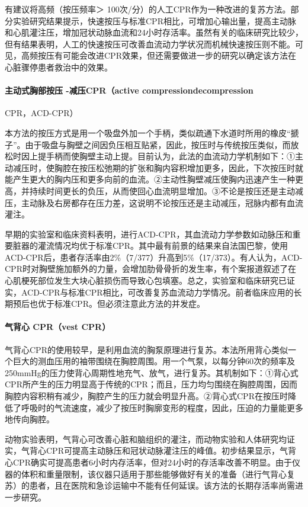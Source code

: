 有建议将高频（按压频率＞
100次/分）的人工CPR作为一种改进的复苏方法。部分实验研究结果提示，快速按压与标准CPR相比，可增加心输出量，提高主动脉和心肌灌注压，增加冠状动脉血流和24小时存活率。虽然有关的临床研究比较少，但有结果表明，人工的快速按压可改善血流动力学状况而机械快速按压则不能。可见，高频按压有可能会改进CPR效果，但还需要做进一步的研究以确定该方法在心脏骤停患者救治中的效果。

\paragraph{主动式胸部按压 -减压CPR（active compressiondecompression}
CPR，ACD-CPR）

本方法的按压方式是用一个吸盘外加一个手柄，类似疏通下水道时所用的橡皮“搋子”。由于吸盘与胸壁之间因负压相互贴紧，因此，按压时与传统按压类似，而放松时因上提手柄而使胸壁主动上提。目前认为，此法的血流动力学机制如下：①主动减压时，使胸腔在按压松弛期的扩张和胸内容积增加更多，因此，下次按压时就能产生更大的胸内压和更多向前的血流。②主动性胸壁减压使胸内迅速产生一种更高，并持续时间更长的负压，从而使回心血流明显增加。③不论是按压还是主动减压，主动脉及右房都存在压力差，这说明不论按压还是主动减压，冠脉内都有血流灌注。

早期的实验室和临床资料表明，进行ACD-CPR，其血流动力学参数如动脉压和重要脏器的灌流情况均优于标准CPR。其中最有前景的结果来自法国巴黎，使用ACD-CPR后，患者存活率由2\%（7/377）升高到5\%（17/373）。有人认为，ACD-CPR时对胸壁施加额外的力量，会增加肋骨骨折的发生率，有个案报道叙述了在心肌梗死部位发生大块心脏损伤而导致心包填塞。总之，实验室和临床研究已证实，ACD-CPR与标准CPR相比，可改善复苏血流动力学情况。前者临床应用的长期预后也优于标准CPR。但必须注意此方法的并发症。

\paragraph{气背心 CPR（vest CPR）}

气背心CPR的使用较早，是利用血流的胸泵原理进行复苏。本法所用背心类似一个巨大的测血压用的袖带围绕在胸腔周围。用一个气泵，以每分钟60次的频率及250mmHg的压力使背心周期性地充气、放气，进行复苏。其机制如下：①背心式CPR所产生的压力明显高于传统的CPR；而且，压力均匀围绕在胸腔周围，因而胸腔内容积稍有减少，胸腔产生的压力就会明显升高。②背心式CPR在按压时降低了呼吸时的气流速度，减少了按压时胸廓变形的程度，因此，压迫的力量能更多地传向胸腔。

动物实验表明，气背心可改善心脏和脑组织的灌注，而动物实验和人体研究均证实，气背心CPR可提高主动脉压和冠状动脉灌注压的峰值。初步结果显示，气背心CPR确实可提高患者6小时内存活率，但对24小时的存活率改善不明显。由于仪器的体积和重量限制，该仪器只适用于那些能够做好有关的准备（进行气背心复苏）的患者，且在医院和急诊运输中不能有任何延误。该方法的长期存活率尚需进一步研究。


